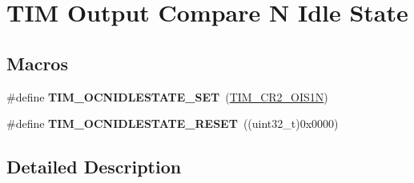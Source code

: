 \hypertarget{group___t_i_m___output___compare___n___idle___state}{}\section{T\+IM Output Compare N Idle State}
\label{group___t_i_m___output___compare___n___idle___state}
\subsection*{Macros}
\begin{DoxyCompactItemize}
\item 
\#define {\bfseries T\+I\+M\+\_\+\+O\+C\+N\+I\+D\+L\+E\+S\+T\+A\+T\+E\+\_\+\+S\+ET}~(\hyperlink{group___peripheral___registers___bits___definition_gae61f8d54923999fffb6db381e81f2b69}{T\+I\+M\+\_\+\+C\+R2\+\_\+\+O\+I\+S1N})\hypertarget{group___t_i_m___output___compare___n___idle___state_ga1f781774c71822b2502633dfc849c5ea}{}\label{group___t_i_m___output___compare___n___idle___state_ga1f781774c71822b2502633dfc849c5ea}

\item 
\#define {\bfseries T\+I\+M\+\_\+\+O\+C\+N\+I\+D\+L\+E\+S\+T\+A\+T\+E\+\_\+\+R\+E\+S\+ET}~((uint32\+\_\+t)0x0000)\hypertarget{group___t_i_m___output___compare___n___idle___state_ga7586655652e3c3f1cb4af1ed59d25901}{}\label{group___t_i_m___output___compare___n___idle___state_ga7586655652e3c3f1cb4af1ed59d25901}

\end{DoxyCompactItemize}


\subsection{Detailed Description}
